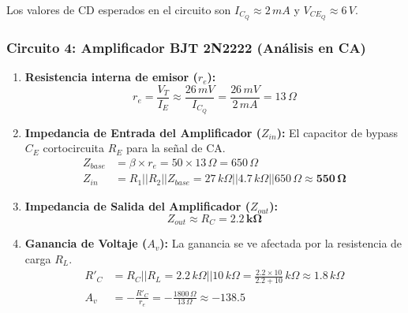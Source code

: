 \documentclass[11pt]{scrartcl}
\begin{document}
Los valores de CD esperados en el circuito son $I_{C_Q} \approx 2 \, mA$ y $V_{CE_Q} \approx 6 \, V$.



\subsubsection{Circuito 4: Amplificador BJT 2N2222 (Análisis en CA)}

\begin{enumerate}
    \item \textbf{Resistencia interna de emisor ($r_e$):}
    \begin{equation*}
        r_e = \frac{V_T}{I_E} \approx \frac{26 \, mV}{I_{C_Q}} = \frac{26 \, mV}{2 \, mA} = 13 \, \Omega
    \end{equation*}
    
    \item \textbf{Impedancia de Entrada del Amplificador ($Z_{in}$):}
    El capacitor de bypass $C_E$ cortocircuita $R_E$ para la señal de CA.
    \begin{align*}
        Z_{base} &= \beta \times r_e = 50 \times 13 \, \Omega = 650 \, \Omega \\
        Z_{in} &= R_1 || R_2 || Z_{base} = 27 \, k\Omega || 4.7 \, k\Omega || 650 \, \Omega \approx \mathbf{550 \, \Omega}
    \end{align*}
    
    \item \textbf{Impedancia de Salida del Amplificador ($Z_{out}$):}
    \begin{equation*}
        Z_{out} \approx R_C = \mathbf{2.2 \, k\Omega}
    \end{equation*}

    \item \textbf{Ganancia de Voltaje ($A_v$):} La ganancia se ve afectada por la resistencia de carga $R_L$.
    \begin{align*}
        R'_{C} &= R_C || R_L = 2.2 \, k\Omega || 10 \, k\Omega = \frac{2.2 \times 10}{2.2 + 10} \, k\Omega \approx 1.8 \, k\Omega \\
        A_v &= -\frac{R'_{C}}{r_e} = -\frac{1800 \, \Omega}{13 \, \Omega} \approx \mathbf{-138.5}
    \end{align*}
\end{enumerate}
\end{document}
